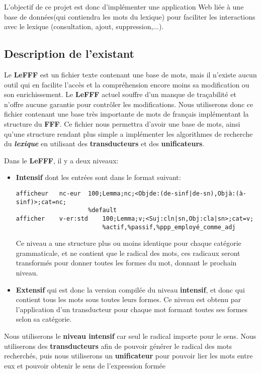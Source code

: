 {L'objectif de ce projet est donc d'implémenter une application Web liée à une base de données(qui contiendra les mots du lexique) pour faciliter les interactions avec le lexique (consultation, ajout, suppression,...).\par}


\subsection{Description de l'existant }
{Le \textbf{LeFFF} est un fichier texte contenant une base de mots, mais il n'existe aucun outil qui en facilite l'accès et la compréhension encore moins sa modification ou son enrichissement. Le \textbf{LeFFF} actuel souffre d'un manque de traçabilité et n'offre aucune garantie pour contrôler les modifications. Nous utiliserons donc ce fichier contenant une base très importante de mots de français implémentant la structure du \textbf{FFF}. Ce fichier nous permettra d'avoir une base de mots, ainsi qu'une structure rendant plus simple a implémenter les algorithmes de recherche du \textit{\bf lexique} en utilisant des \textbf{transducteurs} et des \textbf{unificateurs}.\par}
{Dans le \textbf{LeFFF}, il y a deux niveaux:\par}
\begin{itemize}
\item \textbf{Intensif} dont les entrées sont dans le format suivant:
\small
\begin{verbatim}
afficheur	nc-eur	100;Lemma;nc;<Objde:(de-sinf|de-sn),Objà:(à-sinf)>;cat=nc;
                    %default
afficher	v-er:std	100;Lemma;v;<Suj:cln|sn,Obj:cla|sn>;cat=v;
                        %actif,%passif,%ppp_employé_comme_adj
\end{verbatim}
\normalsize
Ce niveau a une structure plus ou moins identique pour chaque catégorie grammaticale, et ne contient que le radical des mots, ces radicaux seront transformés pour donner toutes les formes du mot, donnant le prochain niveau.
\item \textbf{Extensif} qui est donc la version compilée du niveau \textbf{intensif}, et donc qui contient tous les mots sous toutes leurs formes. Ce niveau est obtenu par l'application d'un transducteur pour chaque mot formant toutes ses formes selon sa catégorie.
\end{itemize}
{Nous utiliserons le \textbf{niveau intensif} car seul le radical importe pour le sens. Nous utiliserons des \textbf{transducteurs} afin de pouvoir générer le radical des mots recherchés, puis nous utiliserons un \textbf{unificateur} pour pouvoir lier les mots entre eux et pouvoir obtenir le sens de l'expression formée}
